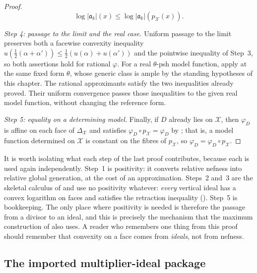 \begin{proof}
\[
 \log|\mathfrak a_k|(x)
 \leq\log|\mathfrak a_k|(p_{\mathcal X}(x)).
\]

\emph{Step 4: passage to the limit and the real case.}  Uniform passage to
the limit preserves both a facewise convexity inequality
$u(\tfrac12(\alpha+\alpha'))\leq\tfrac12(u(\alpha)+u(\alpha'))$ and the
pointwise inequality of Step~3, so both assertions hold for rational
$\varphi$.  For a real $\theta$-psh model function, apply
 at the same fixed form
$\theta$, whose generic class is ample by the standing hypotheses of
this chapter.  The rational approximants satisfy the two inequalities
already proved.  Their uniform convergence passes those inequalities to
the given real model function, without changing the reference form.

\emph{Step 5: equality on a determining model.}  Finally, if
$D$ already lies on $\mathcal X$, then $\varphi_D$ is affine on each
face of $\Delta_{\mathcal X}$ and satisfies
$\varphi_D\circ p_{\mathcal X}=\varphi_D$ by
; that is, a model function determined on
$\mathcal X$ is constant on the fibres of $p_{\mathcal X}$, so
$\varphi_D=\varphi_D\circ p_{\mathcal X}$.
\end{proof}

\begin{remark}
\label{rem:ch21-lemma-ingredients}
It is worth isolating what each step of the last proof contributes, because
each is used again independently.  Step~1 is positivity: it converts
relative nefness into relative global generation, at the cost of an
approximation.  Steps~2 and~3 are the skeletal calculus of
 and use no positivity whatever: \emph{every} vertical
ideal has a convex logarithm on faces and satisfies the retraction
inequality ().  Step~5 is bookkeeping.  The
only place where positivity is needed is therefore the passage from a
divisor to an ideal, and this is precisely the mechanism that the maximum
construction of  also uses.  A reader who
remembers one thing from this proof should remember that convexity on a face
comes from \emph{ideals}, not from nefness.
\end{remark}

\subsection{The imported multiplier-ideal package}
\label{sec:ch21-multiplier-input}

